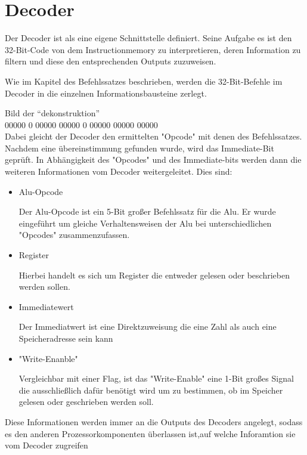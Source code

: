 \documentclass[paper=a4,fontsize=12pt,twocolumn]{scrreprt}
\begin{document}

\section{Decoder}


Der Decoder ist als eine eigene Schnittstelle definiert. Seine Aufgabe es ist den 32-Bit-Code von dem Instructionmemory zu interpretieren, deren Information zu filtern und diese den entsprechenden Outputs zuzuweisen.
 {\color{red}
Wie im Kapitel des Befehlssatzes beschrieben, werden die 32-Bit-Befehle im Decoder in die einzelnen Informationsbausteine zerlegt.

Bild der \enquote{dekonstruktion}
\\
 00000  0  00000  00000   0 00000 00000 00000
\\

Dabei gleicht der Decoder den ermittelten "Opcode" mit denen des Befehlssatzes. Nachdem eine übereinstimmung gefunden wurde, wird das Immediate-Bit geprüft. In Abhängigkeit des "Opcodes" und des Immediate-bits werden dann die weiteren Informationen vom Decoder weitergeleitet. 
Dies sind:

\begin{itemize}
 \item Alu-Opcode

 Der Alu-Opcode ist ein 5-Bit großer Befehlssatz für die Alu. Er wurde eingeführt um gleiche Verhaltensweisen der Alu bei unterschiedlichen "Opcodes" zusammenzufassen.

\item Register

 Hierbei handelt es sich um Register die entweder gelesen oder beschrieben werden sollen. 

\item Immediatewert

 Der Immediatwert ist eine Direktzuweisung die eine Zahl als auch eine Speicheradresse sein kann

\item "Write-Enanble"

 Vergleichbar mit einer Flag, ist das "Write-Enable" eine 1-Bit großes Signal die ausschließlich dafür benötigt wird um zu bestimmen, ob im Speicher gelesen oder geschrieben werden soll.
\end{itemize}

 Diese Informationen werden immer an die Outputs des Decoders angelegt, sodass es den anderen Prozessorkomponenten überlassen ist,auf welche Inforamtion sie vom Decoder zugreifen}
\end{document}
